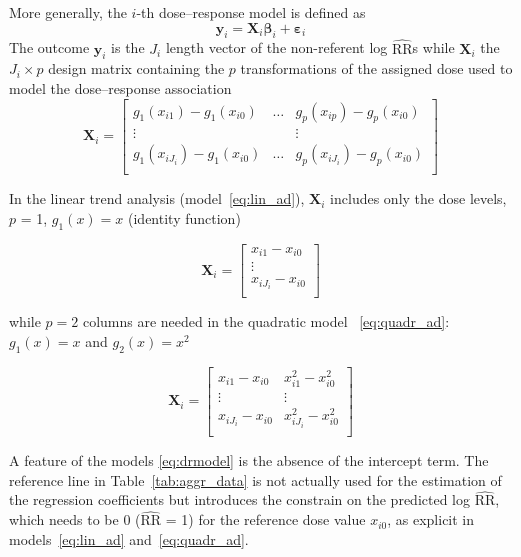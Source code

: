 \documentclass[11pt,a4paper,twoside,openany]{book}\usepackage{knitr}
\begin{document}
{\noindent More generally, the $i$-th dose--response model is defined as
\begin{equation}
\mathbf{y}_i = \mathbf{X}_i \boldsymbol{\beta}_i + \boldsymbol{\varepsilon}_i
\label{eq:drmodel}
\end{equation}
The outcome $\mathbf{y}_i$ is the $J_i$ length vector of the non-referent log $\widehat{\mathrm{RR}}$s while $\mathbf{X}_i$ the $J_i \times p$ design matrix containing the $p$ transformations of the assigned dose used to model the dose--response association
\begin{equation}
 \mathbf{X}_i=\left[
\begin{array}{ccc}
g_{1}(x_{i1}) - g_{1}(x_{i0}) & \hdots & g_{p}(x_{ip}) - g_{p}(x_{i0}) \\
\vdots &  & \vdots \\
g_{1}(x_{iJ_i}) -  g_{1}(x_{i0}) & \hdots & g_{p}(x_{iJ_i}) -  g_{p}(x_{i0}) \\
\end{array}%
\right] 
\label{eq:des.matrix}
\end{equation}

\noindent In the linear trend analysis (model~\ref{eq:lin_ad}), $\mathbf{X}_i$ includes only the dose levels, $p$ = 1, $g_1(x) = x$ (identity function)

\begin{equation*}
 \mathbf{X}_i=\left[
\begin{array}{c}
x_{i1} - x_{i0} \\
\vdots \\
x_{iJ_i} - x_{i0} \\
\end{array}%
\right] 
\end{equation*}

\noindent while $p = 2$ columns are needed in the quadratic model ~\ref{eq:quadr_ad}: $g_1(x) = x$ and $g_2(x) = x^2$

\begin{equation*}
 \mathbf{X}_i=\left[
\begin{array}{cc}
x_{i1} - x_{i0} & x_{i1}^2 - x_{i0}^2 \\
\vdots & \vdots \\
x_{iJ_i} - x_{i0} & x_{iJ_i}^2 - x_{i0}^2 \\
\end{array}%
\right] 
\end{equation*}

\noindent A feature of the models \ref{eq:drmodel} is the absence of the intercept term. The reference line in Table~\ref{tab:aggr_data} is not actually used for the estimation of the regression coefficients but introduces the constrain on the predicted log $\widehat{\mathrm{RR}}$, which needs to be 0 ($\widehat{\mathrm{RR}}$ = 1) for the reference dose value $x_{i0}$, as explicit in models~\ref{eq:lin_ad} and~\ref{eq:quadr_ad}.

}
\end{document}
